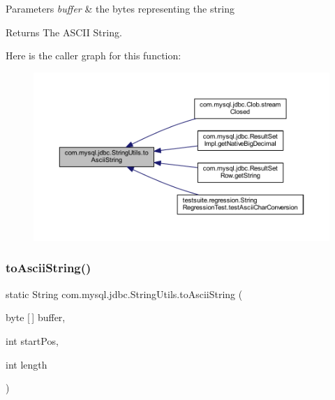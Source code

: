 \begin{DoxyParams}{Parameters}
{\em buffer} & the bytes representing the string\\
\hline
\end{DoxyParams}
\begin{DoxyReturn}{Returns}
The A\+S\+C\+II String. 
\end{DoxyReturn}
Here is the caller graph for this function\+:
\nopagebreak
\begin{figure}[H]
\begin{center}
\leavevmode
\includegraphics[width=350pt]{classcom_1_1mysql_1_1jdbc_1_1_string_utils_a8b353d590943a20a16b5f6772b1eac8a_icgraph}
\end{center}
\end{figure}
\mbox{\label{classcom_1_1mysql_1_1jdbc_1_1_string_utils_acb96fd30c2b868b8823a0b930d8aca49}} 
\subsubsection{\texorpdfstring{to\+Ascii\+String()}{toAsciiString()}\hspace{0.1cm}{\footnotesize\ttfamily [2/2]}}
{\footnotesize\ttfamily static String com.\+mysql.\+jdbc.\+String\+Utils.\+to\+Ascii\+String (\begin{DoxyParamCaption}\item[{byte \mbox{[}$\,$\mbox{]}}]{buffer,  }\item[{int}]{start\+Pos,  }\item[{int}]{length }\end{DoxyParamCaption})\hspace{0.3cm}{\ttfamily [static]}}

